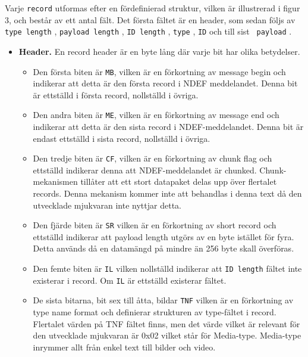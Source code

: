 \documentclass[11pt]{article}
\begin{document}

Varje \texttt{record} utformas efter en fördefinierad struktur, vilken är illustrerad i figur 3, och består av ett antal fält. Det första fältet är en header, som sedan följs av  \texttt{type length} ,  \texttt{payload length} ,  \texttt{ID length} ,  \texttt{type} ,  \texttt{ID}  och till sist  \texttt{ payload} .


\begin{itemize}
\item \textbf{Header.} En record header är en byte lång där varje bit har olika betydelser.

\begin{itemize}
\item Den första biten är \texttt{MB}, vilken är en förkortning av message begin och indikerar att detta är den första record i NDEF meddelandet. Denna bit är ettställd i första record, nollställd i övriga.
\item Den andra biten är \texttt{ME}, vilken är en förkortning av message end och indikerar att detta är den sista record i NDEF-meddelandet. Denna bit är endast ettställd i sista record, nollställd i övriga.
\item Den tredje biten är \texttt{CF}, vilken är en förkortning av chunk flag och ettställd indikerar denna att NDEF-meddelandet är chunked. Chunk-mekanismen tillåter att ett stort datapaket delas upp över flertalet records. Denna mekanism kommer inte att behandlas i denna text då den utvecklade mjukvaran inte nyttjar detta.
\item Den fjärde biten är \texttt{SR} vilken är en förkortning av short record och ettställd indikerar att payload length utgörs av en byte istället för fyra. Detta används då en datamängd på mindre än 256 byte skall överföras.
\item Den femte biten är \texttt{IL} vilken nollställd indikerar att \texttt{ID length} fältet inte existerar i record. Om \texttt{IL} är ettställd existerar fältet.
\item De sista bitarna, bit sex till åtta, bildar \texttt{TNF} vilken är en förkortning av type name format och definierar strukturen av type-fältet i record. Flertalet värden på TNF fältet finns, men det värde vilket är relevant för den utvecklade mjukvaran är 0x02 vilket står för Media-type. Media-type inrymmer allt från enkel text till bilder och video.
\end{itemize}


\end{itemize}
\end{document}

